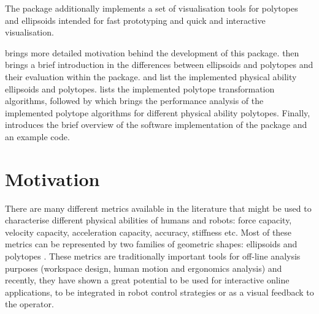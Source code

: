 The package additionally implements a set of visualisation tools for polytopes and ellipsoids intended for fast prototyping and quick and interactive visualisation.

 brings more detailed motivation behind the development of this package.  then brings a brief introduction in the differences between ellipsoids and polytopes and their evaluation within the package.  and  list the implemented physical ability ellipsoids and polytopes.  lists the implemented polytope transformation algorithms, followed by  which brings the performance analysis of the implemented polytope algorithms for different physical ability polytopes. Finally,  introduces the brief overview of the software implementation of the package and an example code.

\section{Motivation}
\label{sec:pycpacity_motivation}


There are many different metrics available in the literature that might be used to characterise different physical abilities of humans and robots: force capacity, velocity capacity, acceleration capacity, accuracy, stiffness etc. Most of these metrics can be represented by two families of geometric shapes: ellipsoids \cite{yoshikawa1985manipulability} and polytopes \cite{chiacchio_evaluation_1996}. These metrics are traditionally important tools for off-line analysis purposes (workspace design, human motion and ergonomics analysis) and recently, they have shown a great potential to be used for interactive online applications, to be integrated in robot control strategies or as a visual feedback to the operator. 

